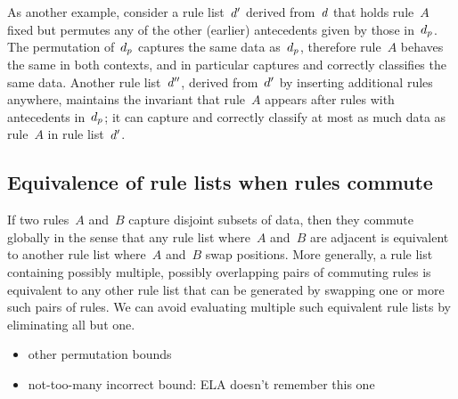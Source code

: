 As another example, consider a rule list~${d}'$ derived from~${d}$ that holds rule~$A$ fixed
but permutes any of the other (earlier) antecedents given by those in~$d_p$.
%
The permutation of~$d_p$ captures the same data as~$d_p$,
therefore rule~$A$ behaves the same in both contexts,
and in particular captures and correctly classifies the same data.
%
Another rule list~${d}''$, derived from~${d}'$ by inserting additional rules anywhere,
maintains the invariant that rule~$A$ appears after rules with antecedents in~$d_p$;
it can capture and correctly classify at most as much data as rule~$A$ in rule list~${d}'$.
%

\subsection{Equivalence of rule lists when rules commute}

If two rules~$A$ and~$B$ capture disjoint subsets of data,
then they commute globally in the sense that any rule list where~$A$ and~$B$ are
adjacent is equivalent to another rule list where~$A$ and~$B$ swap positions.
%
More generally, a rule list containing possibly multiple, possibly overlapping
pairs of commuting rules is equivalent to any other rule list that can be generated
by swapping one or more such pairs of rules.
%
We can avoid evaluating multiple such equivalent rule lists by eliminating all but one.
%

\begin{itemize}
\item other permutation bounds
\item not-too-many incorrect bound:  ELA doesn't remember this one
\end{itemize}

